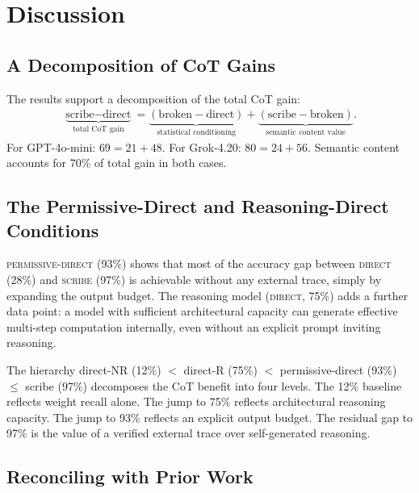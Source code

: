 \documentclass[11pt]{article}
\begin{document}
\section{Discussion}

\subsection{A Decomposition of CoT Gains}

The results support a decomposition of the total CoT gain:
\begin{align}
\underbrace{\text{scribe} - \text{direct}}_{\text{total CoT gain}} =
\underbrace{(\text{broken} - \text{direct})}_{\text{statistical conditioning}}
+ \underbrace{(\text{scribe} - \text{broken})}_{\text{semantic content value}}.
\end{align}
For GPT-4o-mini: $69 = 21 + 48$. For Grok-4.20: $80 = 24 + 56$. Semantic content accounts
for 70\% of total gain in both cases.

\subsection{The Permissive-Direct and Reasoning-Direct Conditions}

\textsc{permissive-direct} (93\%) shows that most of the accuracy gap between \textsc{direct}
(28\%) and \textsc{scribe} (97\%) is achievable without any external trace, simply by
expanding the output budget. The reasoning model (\textsc{direct}, 75\%) adds a further
data point: a model with sufficient architectural capacity can generate effective multi-step
computation internally, even without an explicit prompt inviting reasoning.

The hierarchy direct-NR (12\%) $<$ direct-R (75\%) $<$ permissive-direct (93\%)
$\leq$ scribe (97\%) decomposes the CoT benefit into four levels. The 12\% baseline reflects
weight recall alone. The jump to 75\% reflects architectural reasoning capacity. The jump to
93\% reflects an explicit output budget. The residual gap to 97\% is the value of a verified
external trace over self-generated reasoning.

\subsection{Reconciling with Prior Work}
\end{document}
